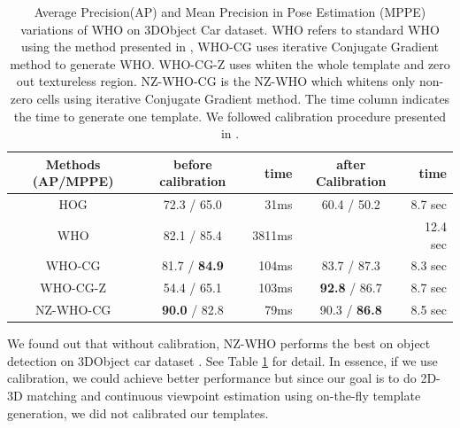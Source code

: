 \documentclass[10pt,twocolumn,letterpaper]{article}
\begin{document}
\begin{table}[!htbp]
    \begin{center}
\begin{tabular}{|c|c|r|c|r|}
\hline
Methods (AP/MPPE) & before calibration  & time & after Calibration \cite{Aubry14} & time \\
\hline\hline
HOG\cite{Dalal05}     & 72.3 / 65.0  &  31ms  & 60.4 / 50.2                 &   8.7 sec \\ 
WHO\cite{Hariharan12} & 82.1 / 85.4  &  3811ms&                             &   12.4 sec  \\
WHO-CG                & 81.7 / \textbf{84.9}  &  104ms &     83.7 / 87.3             &   8.3 sec \\
WHO-CG-Z              & 54.4 / 65.1  &  103ms & \textbf{92.8} / 86.7 &   8.7 sec  \\
NZ-WHO-CG        & \textbf{90.0} / 82.8 & 79ms & 90.3 / \textbf{86.8}                   &  8.5 sec   \\
\hline
\end{tabular}
\end{center}
\caption{Average Precision(AP) and Mean Precision in Pose Estimation (MPPE) \cite{Lopez-Sastre11} variations of WHO on 3DObject Car dataset\cite{Savarese07}. WHO refers to standard WHO using the method presented in \cite{Hariharan12}, WHO-CG uses iterative Conjugate Gradient method to generate WHO. WHO-CG-Z uses whiten the whole template and zero out textureless region. NZ-WHO-CG is the NZ-WHO which whitens only non-zero cells using iterative Conjugate Gradient method. The time column indicates the time to generate one template. We followed calibration procedure presented in \cite{Aubry14}.}
\label{tab:who_initializations}
\end{table}

We found out that without calibration, NZ-WHO performs the best on object detection on 3DObject car dataset \cite{Savarese07}. See Table \ref{tab:who_initializations} for detail. In essence, if we use calibration, we could achieve better performance but since our goal is to do 2D-3D matching and continuous viewpoint estimation using on-the-fly template generation, we did not calibrated our templates.
\end{document}

